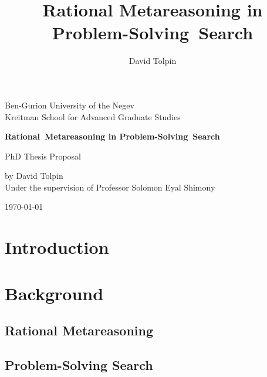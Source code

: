 \documentclass[oneside]{report}
\title {Rational Metareasoning in Problem-Solving~Search}
\author {David Tolpin}
\begin{document}
\begin{titlepage}
\begin{center}
{\large Ben-Gurion University of the Negev
\\
Kreitman School for Advanced Graduate Studies}
\vspace{1in}

{\bf\LARGE Rational~Metareasoning in Problem-Solving~Search}
\vspace{1in}

{\large PhD Thesis Proposal
\\
\vspace{1in}

by David Tolpin
\\
Under the supervision of Professor Solomon Eyal Shimony
\\
\vfill

\today}

\vspace{1in}

\end{center}
\end{titlepage}


\setcounter{page}{1}



\setcounter{tocdepth}{5}
\tableofcontents

\newpage
\setcounter{page}{1}

\chapter{Introduction}
\label{ch:intro}


\chapter{Background}
\label{ch:bg}

\section{Rational Metareasoning}
\label{sec:ratimeta}


\section{Problem-Solving Search}
\label{sec:search}

\end{document}
